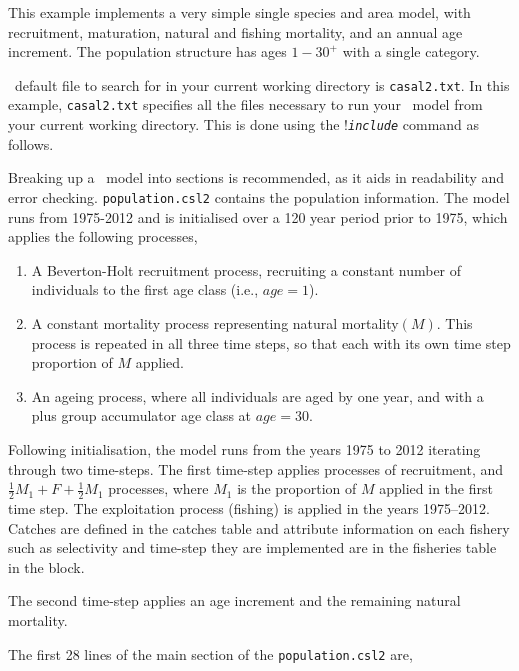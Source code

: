 This example implements a very simple single species and area model, with recruitment, maturation, natural and fishing mortality, and an annual age increment. The population structure has ages $1-30^{+}$ with a single category.

\CNAME\ default file to search for in your current working directory is \texttt{casal2.txt}. In this example, \texttt{casal2.txt} specifies all the files necessary to run your \CNAME\ model from your current working directory. This is done using the !\texttt{\emph{include}} command as follows.
 

Breaking up a \CNAME\ model into sections is recommended, as it aids in readability and error checking. \texttt{population.csl2} contains the population information. The model runs from 1975-2012 and is initialised over a 120 year period prior to  1975, which applies the following processes,

\begin{enumerate}
\item A Beverton-Holt recruitment process, recruiting a constant number of individuals to the first age class (i.e., $age=1$).
\item A constant mortality process representing natural mortality$(M)$. This process is repeated in all three time steps, so that each with its own time step proportion of $M$ applied.

\item An ageing process, where all individuals are aged by one year, and with a plus group accumulator age class at $age=30$.
\end{enumerate}

Following initialisation, the model runs from the years 1975 to 2012 iterating through two time-steps. The first time-step applies processes of recruitment, and  $\frac{1}{2} M_1 + F + \frac{1}{2} M_1$ processes, where $M_1$ is the proportion of $M$ applied in the first time step. The exploitation process (fishing) is applied in the years 1975--2012. Catches are defined in the catches table and attribute information on each fishery such as selectivity and time-step they are implemented are in the fisheries table in the  block.

The second time-step applies an age increment and the remaining natural mortality.

The first 28 lines of the main section of the \texttt{population.csl2} are,
\pagebreak
 

